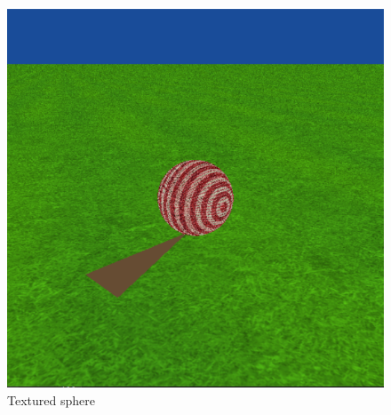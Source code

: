 \begin{figure}[H]
	\centering
	\includegraphics[scale=\imagescale]{images/worksheet_3/textured_sphere}
	\caption{Textured sphere}
	\label{fig:textured_sphere}
\end{figure}
